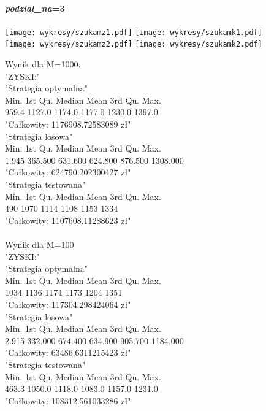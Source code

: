 \documentclass{article}
\begin{document}
\paragraph{\textit{podzial\_na}=3} 
\begin{center}
\texttt{[image: wykresy/szukamz1.pdf]}
\texttt{[image: wykresy/szukamk1.pdf]}
\\
\texttt{[image: wykresy/szukamz2.pdf]}
\texttt{[image: wykresy/szukamk2.pdf]}
\end{center}
Wynik dla M=1000:\\
 "ZYSKI:"\\
 "Strategia optymalna"\\
   Min. 1st Qu.  Median    Mean 3rd Qu.    Max. \\
  959.4  1127.0  1174.0  1177.0  1230.0  1397.0 \\
 "Całkowity:  1176908.72583089 zł"\\
 "Strategia losowa"\\
    Min.  1st Qu.   Median     Mean  3rd Qu.     Max. \\
   1.945  365.500  631.600  624.800  876.500 1308.000 \\
 "Całkowity:  624790.202300427 zł"\\
 "Strategia testowana"\\
   Min. 1st Qu.  Median    Mean 3rd Qu.    Max. \\
    490    1070    1114    1108    1153    1334 \\
 "Całkowity:  1107608.11288623 zł"\\
\\
Wynik dla M=100\\
 "ZYSKI:"\\
 "Strategia optymalna"\\
   Min. 1st Qu.  Median    Mean 3rd Qu.    Max. \\
   1034    1136    1174    1173    1204    1351\\ 
 "Całkowity:  117304.298424064 zł"\\
 "Strategia losowa"\\
    Min.  1st Qu.   Median     Mean  3rd Qu.     Max. \\
   2.915  332.000  674.400  634.900  905.700 1184.000\\ 
 "Całkowity:  63486.6311215423 zł"\\
 "Strategia testowana"\\
   Min. 1st Qu.  Median    Mean 3rd Qu.    Max. \\
  463.3  1050.0  1118.0  1083.0  1157.0  1231.0\\ 
 "Całkowity:  108312.561033286 zł"\\
 
\end{document}

